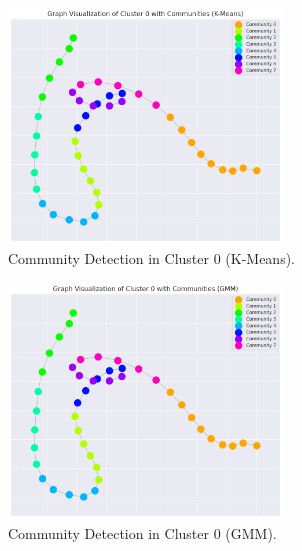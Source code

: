             \begin{figure}[H]
                \centering
                \begin{subfigure}[c]{0.47\textwidth}
                    \centering
                    \includegraphics[width=0.8\textwidth]{../figures/plots/section3/k-means_graph_visualization_of_cluster_0_with_communities.png}
                    \caption{Community Detection in Cluster 0 (K-Means).}
                    \label{fig:kmeans_graph}
                \end{subfigure}
                \hfill
                \begin{subfigure}[c]{0.47\textwidth}
                    \centering
                    \includegraphics[width=0.8\textwidth]{../figures/plots/section3/gmm_graph_visualization_of_cluster_0_with_communities.png}
                    \caption{Community Detection in Cluster 0 (GMM).}
                    \label{fig:gmm_graph}
                \end{subfigure}
                \vspace{-0.1cm}
                \caption{}
                \label{fig:}
            \end{figure}


